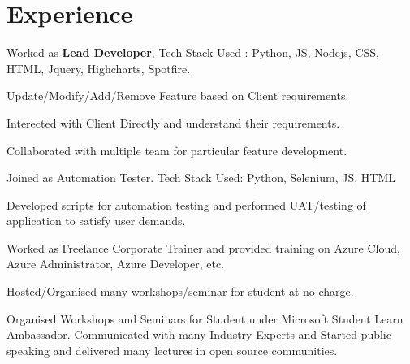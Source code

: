\documentclass[]{Resume}
\begin{document}
\begin{minipage}[t]{0.33\textwidth}
%
%

\end{minipage} 
\hfill
\begin{minipage}[t]{0.66\textwidth} 


\section{Experience}
\vspace{\topsep}
\begin{tightemize}
\item Worked as \textbf{Lead Developer}, Tech Stack Used : Python, JS, Nodejs, CSS, HTML, Jquery, Highcharts, Spotfire.
\item Update/Modify/Add/Remove Feature based on Client requirements.
\item Interected with Client Directly and understand their requirements.
\item Collaborated with multiple team for particular feature development.
\end{tightemize}
\sectionsep

\begin{tightemize}
\item Joined as Automation Tester. Tech Stack Used: Python, Selenium, JS, HTML
\item Developed scripts for automation testing and performed UAT/testing of application to satisfy user demands.
\end{tightemize}
\sectionsep

\begin{tightemize}
\item Worked as Freelance Corporate Trainer and provided training on Azure Cloud, Azure Administrator, Azure Developer, etc.
\item Hosted/Organised many workshops/seminar for student at no charge.
\end{tightemize}
\sectionsep

\begin{tightemize}
\item Organised Workshops and Seminars for Student under Microsoft Student Learn Ambassador. Communicated with many Industry Experts and Started public speaking and delivered many lectures in open source communities.
\end{tightemize}
\sectionsep


\end{minipage}
\end{document}
